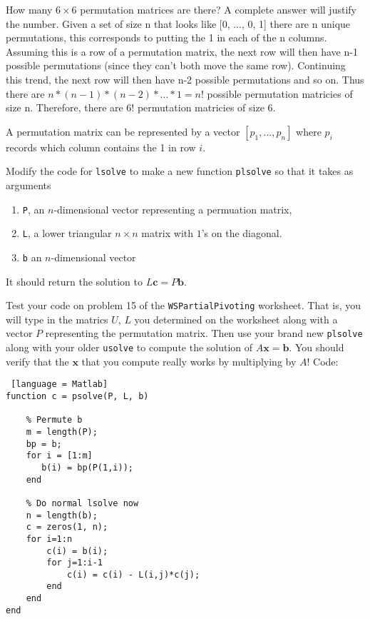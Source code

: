 \documentclass[12pt]{article}
\makeatletter
\theoremstyle{homework}
\newenvironment{exercise}[1]
{\def\@currentlabel{#1}\exercisecore}
{\endexercisecore}
\makeatother
\begin{document}
\begin{exercise}{Supplemental 3}
How many $6\times 6$ permutation matrices are there?  A complete answer will justify the number.
\end{exercise}
Given a set of size n that looks like [0, ..., 0, 1] there are n unique permutations, this corresponds to putting the 1 in each of the n columns. 
Assuming this is a row of a permutation matrix, the next row will then have n-1 possible permutations (since they can't both move the same row). 
Continuing this trend, the next row will then have n-2 possible permutations and so on. Thus there are $n * (n-1) * (n-2) * ... * 1= n!$ possible permutation 
matricies of size n. Therefore, there are 6! permutation matricies of size 6.


\begin{exercise}{Supplemental 4}
A permutation matrix can be represented by a vector $[p_1,\ldots,p_n]$
where $p_i$ records which column contains the 1 in row $i$.

Modify the code for {\tt lsolve} to make a new function
{\tt plsolve} so that it takes as arguments
\begin{enumerate}
\item {\tt P}, an $n$-dimensional vector representing a permuation matrix, 
\item {\tt L}, a lower triangular $n\times n$ matrix with $1$'s on the diagonal.
\item {\tt b} an $n$-dimensional vector
\end{enumerate}
It should return the solution to $L\mathbf{c} = P\mathbf{b}$.

Test your code on problem 15 of the {\tt WSPartialPivoting} worksheet.
That is, you will type in the matrics $U$, $L$ you determined on 
the worksheet along with a vector $P$ representing the permutation matrix.
Then use your brand new {\tt plsolve} along with your older {\tt usolve}
to compute the solution of $A\mathbf{x}=\mathbf{b}$.  You should verify that the $\mathbf{x}$ that you compute really works by multiplying by $A$!
\end{exercise}
Code:
\begin{lstlisting} [language = Matlab]
function c = psolve(P, L, b)
    
    % Permute b
    m = length(P);
    bp = b;
    for i = [1:m]
       b(i) = bp(P(1,i)); 
    end
    
    % Do normal lsolve now
    n = length(b);
    c = zeros(1, n);
    for i=1:n
        c(i) = b(i);
        for j=1:i-1
            c(i) = c(i) - L(i,j)*c(j);
        end
    end
end
\end{lstlisting}
\end{document}

